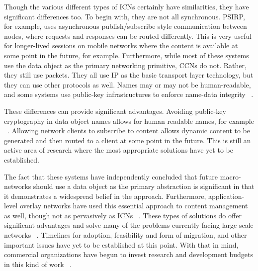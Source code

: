 Though the various different types of ICNs certainly have similarities, they have significant differences too.  To begin with, they are not all synchronous.  PSIRP, for example, uses asynchronous publish/subscribe style communication between nodes, where requests and responses can be routed differently.  This is very useful for longer-lived sessions on mobile networks where the content is available at some point in the future, for example.  Furthermore, while most of these systems use the data object as the primary networking primitive, CCNs do not.  Rather, they still use packets.  They all use IP as the basic transport layer technology, but they can use other protocols as well.  Names may or may not be human-readable, and some systems use public-key infrastructures to enforce name-data integrity ~\cite{6231276}.

These differences can provide significant advantages.  Avoiding public-key cryptography in data object names allows for human readable names, for example ~\cite{6231276}.  Allowing network clients to subscribe to content allows dynamic content to be generated and then routed to a client at some point in the future.  This is still an active area of research where the most appropriate solutions have yet to be established.

The fact that these systems have independently concluded that future macro-networks should use a data object as the primary abstraction is significant in that it demonstrates a widespread belief in the approach.  Furthermore, application-level overlay networks have used this essential approach to content management as well, though not as pervasively as ICNs ~\cite{Tarkoma:2010:ONT:1805887}.  These types of solutions do offer significant advantages and solve many of the problems currently facing large-scale networks ~\cite{6231276}.  Timelines for adoption, feasibility and form of migration, and other important issues have yet to be established at this point.  With that in mind, commercial organizations have begun to invest research and development budgets in this kind of work ~\cite{xerox,parc}.  

	
